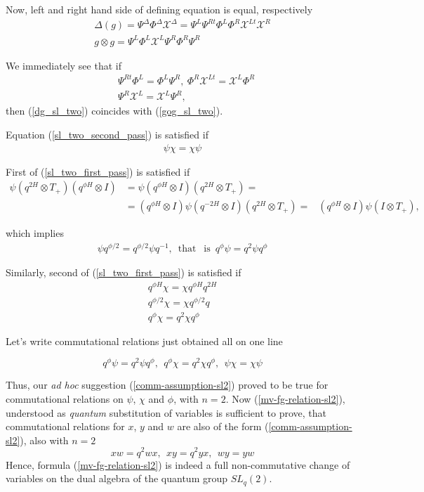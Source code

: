 \documentclass{article}
\newcommand{\lb}{\left (}
\newcommand{\rb}{\right )}
\newcommand{\be}{\begin{eqnarray}}
\newcommand{\ee}{\end{eqnarray}}
\DeclareMathOperator{\that}{that}
\DeclareMathOperator{\is}{is}
\newcommand {\?}{\textit{???}}
\def\dg{\Delta (g)}
\def\gog{g \otimes g}
\def\Chi{\mathcal{X}}
\newcommand{\EChiL}[0]{\Chi^L}
\newcommand{\EChiR}[0]{\Chi^R}
\newcommand{\EChiLT}[0]{\Chi^{Lt}}
\newcommand{\EChiD}[0]{\Chi^\Delta}
\newcommand{\EPsiL}[0]{\Psi^L}
\newcommand{\EPsiR}[0]{\Psi^R}
\newcommand{\EPsiRT}[0]{\Psi^{Rt}}
\newcommand{\EPsiD}[0]{\Psi^\Delta}
\newcommand{\QPhiL}[0]{\Phi^L}
\newcommand{\QPhiR}[0]{\Phi^R}
\newcommand{\QPhiD}[0]{\Phi^\Delta}
\newcommand{\delabel}[1]{(\ref{#1})}
\begin{document}
Now, left and right hand side of defining equation is equal, respectively
\be
& \dg = \EPsiD \QPhiD \EChiD = \EPsiL \EPsiRT \QPhiL \QPhiR \EChiLT \EChiR \label{dg_sl_two} & \\
& \gog = \EPsiL \QPhiL \EChiL \EPsiR \QPhiR \EPsiR \label{gog_sl_two} &
\ee

We immediately see that if
\be
& \EPsiRT \QPhiL = \QPhiL \EPsiR,\ \QPhiR \EChiLT = \EChiL \QPhiR \label{sl_two_first_pass} \\
& \EPsiR \EChiL = \EChiL \EPsiR \label{sl_two_second_pass}
,
\ee
then (\ref{dg_sl_two}) coincides with (\ref{gog_sl_two}).

Equation (\ref{sl_two_second_pass}) is satisfied if
\be
\psi \chi = \chi \psi
\ee

First of (\ref{sl_two_first_pass}) is satisfied if
\be
\psi \lb q^{2H} \otimes T_+ \rb \lb q^{\phi H} \otimes I \rb & = \psi \lb q^{\phi H} \otimes I \rb \lb q^{2H} \otimes T_+ \rb = & \nonumber \\
& = \lb q^{\phi H} \otimes I \rb \psi \lb q^{-2H} \otimes I \rb \lb q^{2H} \otimes T_+ \rb = & \lb q^{\phi H} \otimes I \rb \psi \lb I \otimes T_+ \rb,
\ee

which implies
\be
\psi q^{\phi/2} = q^{\phi/2} \psi q^{-1},\ \that\ \is\ q^\phi \psi = q^2 \psi q^\phi
\ee

Similarly, second of (\ref{sl_two_first_pass}) is satisfied if
\be
q^{\phi H} \chi = \chi q^{\phi H} q^{2H} \\ q^{\phi/2} \chi = \chi q^{\phi/2} q \nonumber \\ q^\phi \chi = q^2 \chi q^\phi \nonumber
\ee

Let's write commutational relations just obtained all on one line

\begin{equation}
\label{comm-relations-psichiphi-sl2}
\boxed{
q^\phi \psi = q^2 \psi q^\phi,\ \ q^\phi \chi = q^2 \chi q^\phi,\ \ \psi \chi = \chi \psi
}
\end{equation}

Thus, our {\it ad hoc} suggestion \delabel{comm-assumption-sl2} proved to be true for commutational
relations on $\psi$, $\chi$ and $\phi$, with $n = 2$.
Now \delabel{mv-fg-relation-sl2}, understood as {\it quantum} substitution of variables is sufficient to
prove, that commutational relations for $x$, $y$ and $w$ are also of the form \delabel{comm-assumption-sl2},
also with $n = 2$
\begin{equation}
\label{comm-relations-wxy-sl2}
\boxed{
x w = q^2 w x,\ \ x y = q^2 y x,\ \ w y = y w
}
\end{equation}
Hence, formula \delabel{mv-fg-relation-sl2} is indeed a full non-commutative change of variables on the
dual algebra of the quantum group $SL_q(2)$.
\end{document}
